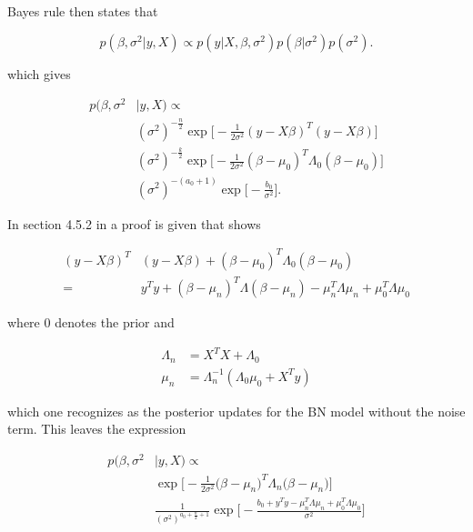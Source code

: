 {{Bayes rule then states that 

$$
p({\beta},\sigma^{2}|y ,X) \propto p(y|X,\beta,\sigma^{2})p(\beta|\sigma^{2})p(\sigma^{2}).
$$

which gives

\begin{equation}
    \begin{split}
        p(\beta, \sigma^2&|y,X) \propto \\
        &(\sigma ^2)^{-\frac {n}{2}}\exp\Big[-\frac{1}{2\sigma^2}(y-X \beta)^T(y -X\beta)\Big]\\
        &(\sigma^2)^{-\frac{k}{2}}\exp\Big[-\frac {1}{2{\sigma }^2}(\beta-\mu_0)^{T}{\Lambda }_0(\beta-\mu_0)\Big]\\
        &(\sigma^2)^{-(a_0+1)}\exp\Big[-\frac{b_0}{\sigma^2}\Big].
    \end{split}
\end{equation}

In section 4.5.2 in \cite{fahrmeir_2013} a proof is given that shows

\begin{equation}
    \begin{split}
        (y-X\beta)^T&(y-X\beta) + (\beta-\mu_0)^T\Lambda_0(\beta-\mu_0) \\
        = &y^Ty + (\beta - \mu_n)^T\Lambda(\beta-\mu_n) - \mu_n^T\Lambda\mu_n + \mu_0^T\Lambda\mu_0
    \end{split}
\end{equation}

where $0$ denotes the prior and 

\begin{align*}
    \Lambda_{n} & = X^TX + \Lambda_{0} \\
    \mu_{n}     & = \Lambda_{n}^{-1}(\Lambda_{0}\mu_{0} + X^Ty)
\end{align*}

which one recognizes as the posterior updates for the BN model without the noise term. This leaves the expression

\begin{equation}
    \begin{split}
        p(\beta, \sigma^2&|y,X) \propto \\
        & \exp\bigg[-\frac{1}{2\sigma^2}\Big(\beta-\mu_n\Big)^T\Lambda_n\Big(\beta-\mu_n\Big)\bigg] \\
        &\frac{1}{(\sigma^2)^{a_0+\frac{n}{2}+1}}\exp\bigg[-\frac{b_0+y^Ty  - \mu_n^T\Lambda\mu_n + \mu_0^T\Lambda\mu_0}{\sigma^2}\bigg]
    \end{split}
\end{equation}

}}
